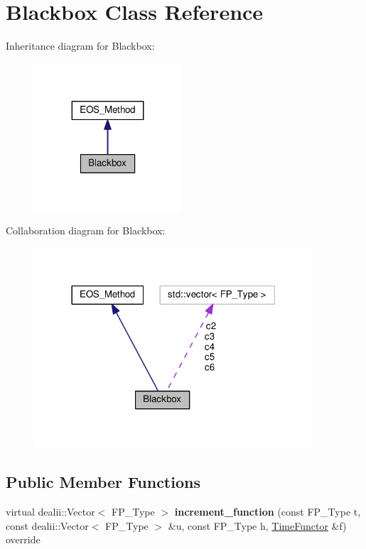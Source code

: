 \hypertarget{classBlackbox}{}\section{Blackbox Class Reference}
\label{classBlackbox}


Inheritance diagram for Blackbox\+:\nopagebreak
\begin{figure}[H]
\begin{center}
\leavevmode
\includegraphics[width=155pt]{classBlackbox__inherit__graph}
\end{center}
\end{figure}


Collaboration diagram for Blackbox\+:\nopagebreak
\begin{figure}[H]
\begin{center}
\leavevmode
\includegraphics[width=294pt]{classBlackbox__coll__graph}
\end{center}
\end{figure}
\subsection*{Public Member Functions}
\begin{DoxyCompactItemize}
\item 
\mbox{\label{classBlackbox_a988148cdbb8518f5e3ee4f9b72a78d62}} 
virtual dealii\+::\+Vector$<$ F\+P\+\_\+\+Type $>$ {\bfseries increment\+\_\+function} (const F\+P\+\_\+\+Type t, const dealii\+::\+Vector$<$ F\+P\+\_\+\+Type $>$ \&u, const F\+P\+\_\+\+Type h, \hyperlink{classTimeFunctor}{Time\+Functor} \&f) override
\end{DoxyCompactItemize}
